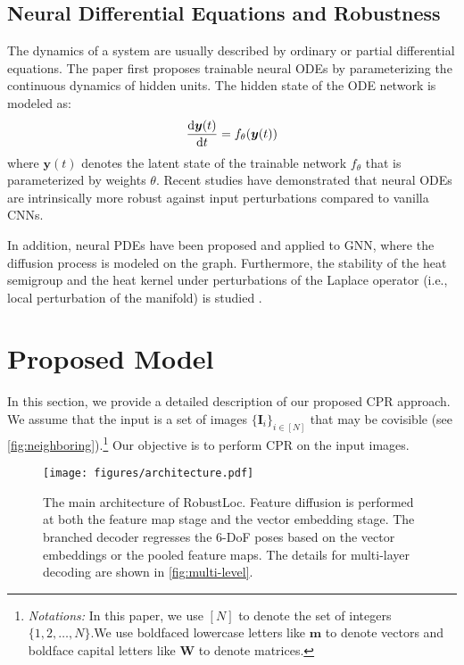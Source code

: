 \documentclass[letterpaper]{article} \usepackage{aaai23}  \usepackage{times}  \usepackage{helvet}  \usepackage{courier}  \usepackage[hyphens]{url}  \usepackage{graphicx} \urlstyle{rm} \def\UrlFont{\rm}  \usepackage{natbib}  \usepackage{caption} \frenchspacing  \setlength{\pdfpagewidth}{8.5in} \setlength{\pdfpageheight}{11in} \usepackage{booktabs}
\theoremstyle{remark}
\theoremstyle{plain}
\newcommand{\mbI}{\bm{I}}
\newcommand{\mbm}{\bm{m}}
\newcommand{\mbW}{\bm{W}}
\newcommand{\mby}{\bm{y}}
\begin{document}
\subsection{Neural Differential Equations and Robustness}

The dynamics of a system are usually described by ordinary or partial differential equations. The paper \cite{chen2018neural} first proposes trainable neural ODEs by parameterizing the continuous dynamics of hidden units. The hidden state of the ODE network is modeled as:
\begin{align}
\ddfrac{\mby(t)}{t}=f_{\theta}(\mby(t)) \label{eq:ode_f}
\end{align}
where  $\mby(t)$ denotes the latent state of the trainable network $f_{\theta}$ that is parameterized by weights $\theta$. Recent studies \cite{yan2019robustness,kang2021Neurips} have demonstrated that neural ODEs are intrinsically more robust against input perturbations compared to vanilla CNNs. 



In addition, neural PDEs \cite{chamberlain2021grand, chamberlain2021blend} have been proposed and applied to GNN, where the diffusion process is modeled on the graph. Furthermore, the stability of the heat semigroup and the heat kernel under perturbations of the Laplace operator (i.e., local perturbation of the manifold) is studied \cite{SonKanWan:C22}.



\section{Proposed Model}



In this section, we provide a detailed description of our proposed CPR approach.
We assume that the input is a set of images $\{\mbI_{i}\}_{i\in [N]}$ that may be covisible (see \cref{fig:neighboring}).\footnote{\emph{Notations:} In this paper, we use $[N]$ to denote the set of integers $\{1, 2, \ldots, N\}$.We use boldfaced lowercase letters like $\mbm$ to denote vectors and boldface capital letters like $\mbW$ to denote matrices.} Our objective is to perform CPR on the input images.














\begin{figure*}[ht]
\begin{center}
\texttt{[image: figures/architecture.pdf]}
\end{center}
\caption{The main architecture of RobustLoc. Feature diffusion is performed at both the feature map stage and the vector embedding stage. The branched decoder regresses the 6-DoF poses based on the vector embeddings or the pooled feature maps. The details for multi-layer decoding are shown in \cref{fig:multi-level}. }
\label{fig:model}
\end{figure*}
\end{document}
